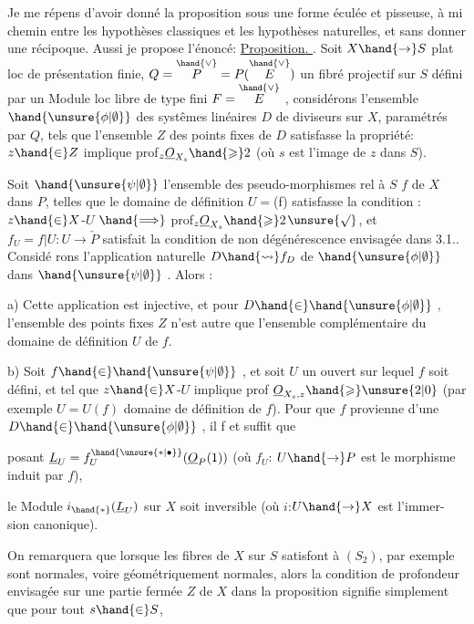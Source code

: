 \placedmargin{$|$}
Je me répens d'avoir donné la proposition  sous une forme éculée et
pisseuse, à mi chemin entre  les hypothèses classiques et les hypothèses
naturelles, et sans donner une récipoque. Aussi je propose l'énoncé:
\uline{Proposition. }.  Soit $X \hand{\to} S$ plat loc de présentation
finie,  $Q=\overset{\hand{\vee}}{P} = P(\overset{\hand{\vee}}{E})$  un fibré  projectif sur $S$ défini par
un Module loc  libre de type fini $F = \overset{\hand{\vee}}{E}$ ,  considérons l'ensemble
$\hand{\unsure{\phi|\emptyset}}$  des systêmes linéaires $D$  de diviseurs  sur $X$, paramétrés par $Q$, tels
que l'ensemble  $Z$ des points fixes de $D$  satisfasse la propriété: $z \hand{\in} Z$
implique prof$_z \underline{O}_{X_s} \hand{\geqslant} 2$  (où  $s$  est l'image de $z$ dans $S$). 

  Soit $\hand{\unsure{\psi|\emptyset}}$ l'ensemble des  pseudo-morphismes rel à
$S$ $f$ de $X$ dans  $P$, telles que le domaine de définition $U=$(f)
 satisfasse la condition : $z \hand{\in} X$-$U$ $\hand{\Longrightarrow}$ prof$_z \underline{O}_{X_s} \hand{\geqslant} 2$$\unsure{\surd}$, et $f_U = f|U : U \to \check{P}$ satisfait la condition de non dégénérescence envisagée dans 3.1.. Considé
rons l'application naturelle  $D \hand{\rightsquigarrow} f_D$  de $\hand{\unsure{\phi|\emptyset}}$  dans $\hand{\unsure{\psi|\emptyset}}$ .  Alors :

a)  Cette application est injective,  et  pour $D \hand{\in} \hand{\unsure{\phi|\emptyset}}$ , l'ensemble des
points fixes $Z$  n'est autre que l'ensemble  complémentaire du domaine de
définition  $U$ de $f$.

b)   Soit
$f \hand{\in} \hand{\unsure{\psi|\emptyset}}$ , et soit $U$ un ouvert sur lequel $f$ soit défini, et tel que $z \hand{\in} X$-$U$
implique prof $\underline{O}_{X_s,z} \hand{\geqslant} \unsure{2|0}$  (par exemple $U = U(f)$ domaine de
définition de $f$). Pour que $f$ provienne d'une $D \hand{\in} \hand{\unsure{\phi|\emptyset}}$ , il f et suffit  que\hand{\unsure{$\surd$}}

posant $\underline{L}_U = f_U^{\hand{\unsure{*|\bullet}}}(\underline{O}_P(1))$  (où  $f_U$: $U \hand{\to} P$  est le morphisme induit par $f$),

 le Module  $i_{\hand{*}}(\underline{L}_U)$  sur $X$ soit inversible (où $i$:$U \hand{\to} X$ est l'immer-%
sion canonique).

On remarquera que lorsque  les fibres de $X$ sur $S$ satisfont à $(S_2)$,
par exemple sont normales, voire géométriquement  normales, alors la
condition de profondeur  envisagée sur  une partie fermée $Z$ de $X$ dans 
la proposition  signifie simplement que pour tout $s \hand{\in} S$,

